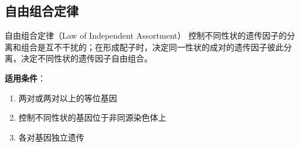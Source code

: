 \documentclass[a4paper,11pt]{ctexart}
\begin{document}
\subsection{自由组合定律}

\begin{theorembox}{自由组合定律（Law of Independent Assortment）}
控制不同性状的遗传因子的分离和组合是互不干扰的；在形成配子时，决定同一性状的成对的遗传因子彼此分离，决定不同性状的遗传因子自由组合。

\textbf{适用条件}：
\begin{enumerate}[leftmargin=2em]
    \item 两对或两对以上的等位基因
    \item 控制不同性状的基因位于非同源染色体上
    \item 各对基因独立遗传
\end{enumerate}
\end{theorembox}
\end{document}
